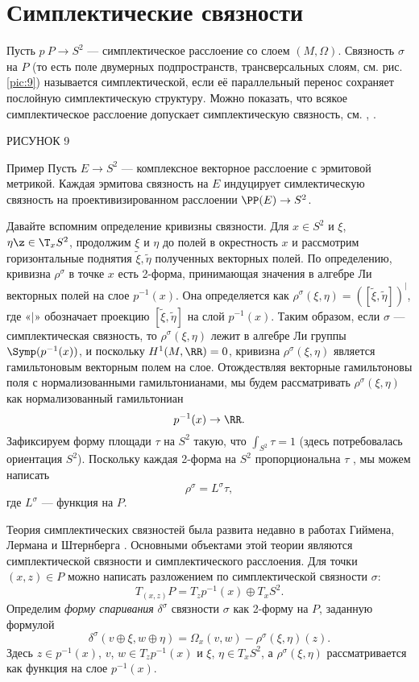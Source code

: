 \section{Симплектические связности}

Пусть $p\: P\to S^2$ --- симплектическое расслоение со слоем $(M,\Omega)$.
Связность $\sigma$ на $P$ (то есть поле двумерных подпространств, трансверсальных слоям, см. рис. \ref{pic:9}) называется симплектической, если её параллельный перенос сохраняет послойную симплектическую структуру.
Можно показать, что всякое симплектическое расслоение допускает симплектическую связность, см. \cite{GLS}, \cite{MS}.

РИСУНОК 9 

\begin{thm*}{Пример}
Пусть $E \to S^2$ --- комплексное векторное расслоение с эрмитовой метрикой.
Каждая эрмитова связность на $E$ индуцирует симлектическую связность на проективизированном расслоении $\PP(E) \to S^2$.
\end{thm*}

Давайте вспомним определение кривизны связности.
Для $x \in S^2$ и $\xi$, $\eta \z\in \T_x S^2$, продолжим $\xi$ и $\eta$ до полей в окрестность $x$ и рассмотрим горизонтальные поднятия $\tilde\xi, \tilde\eta$ полученных векторных полей.
По определению, кривизна $\rho^\sigma$ в точке $x$ есть 2-форма, принимающая значения в алгебре Ли векторных полей на слое $p^{-1}(x)$.
Она определяется как $\rho^\sigma (\xi, \eta) = ([\tilde\xi, \tilde\eta])^\vert$, где «$\vert$» обозначает проекцию $[\tilde\xi, \tilde\eta]$ на слой $p^{-1} (x)$.
Таким образом, если $\sigma$ --- симплектическая связность, то $\rho^\sigma (\xi, \eta)$ лежит в алгебре Ли группы $\Symp(p^{-1}(x))$, и поскольку $H^1 (M, \RR) = 0$, кривизна $\rho^\sigma (\xi, \eta)$ является гамильтоновым векторным полем на слое.
Отождествляя векторные гамильтоновы поля с нормализованными гамильтонианами, мы будем рассматривать $\rho^\sigma (\xi, \eta)$ как нормализованный гамильтониан
\[p^{-1} (x) \to \RR.\]
Зафиксируем форму площади $\tau$ на $S^2$ такую, что $\int_{S^2} \tau = 1$ (здесь потребовалась ориентация $S^2$).
Поскольку каждая 2-форма на $S^2$ пропорциональна $\tau$ , мы можем написать 
\[\rho^\sigma = L^\sigma \tau,\]
где $L^\sigma$ --- функция на $P$.

Теория симплектических связностей была развита недавно в работах Гиймена, Лермана и Штернберга \cite{GLS,MS}.
Основными объектами этой теории являются  симплектической связности и  симплектического расслоения.
Для точки $(x, z) \in P$ можно написать разложением по симплектической связности $\sigma$:
\[T_{(x,z)} P = T_z p^{-1} (x) \oplus T_x S^2.\]
Определим \emph{форму спаривания} $\delta^\sigma$ связности $\sigma$ как 2-форму на $P$, заданную формулой 
\[\delta^\sigma (v \oplus \xi, w \oplus \eta) = \Omega_x (v, w) - \rho^\sigma (\xi, \eta)(z).\]
Здесь $z \in p^{-1} (x)$, $v$, $w \in T_z p^{-1} (x)$ и $\xi$, $\eta \in T_x S^2$, а $\rho^\sigma (\xi, \eta)$ рассматривается как функция на слое $p^{-1} (x)$.

